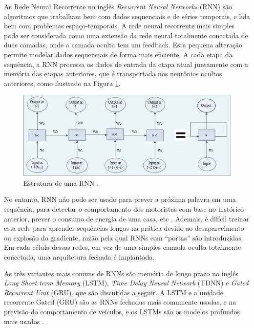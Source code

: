  \label{rnn}

As Rede Neural Recorrente no inglês \textit{Recurrent Neural Networks} (RNN) são algoritmos que trabalham bem com dados sequenciais e de séries temporais, e lida bem com problemas espaço-temporais. A rede neural recorrente mais simples pode ser considerada como uma extensão da rede neural totalmente conectada de duas camadas, onde a camada oculta tem um feedback. Esta pequena alteração permite modelar dados sequenciais de forma mais eficiente. A cada etapa da sequência, a RNN processa os dados de entrada da etapa atual juntamente com a memória das etapas anteriores, que é transportada nos neurônios ocultos anteriores, como ilustrado na Figura \ref{RNN}.

\begin{figure}[H]
\centering
\includegraphics[width=\textwidth]{Figures/RNN.png}
\caption{Estrutura de uma RNN \cite{software-cnn}.}
\label{RNN}
\end{figure}

No entanto, RNN não pode ser usado para prever a próxima palavra em uma sequência, para detectar o comportamento dos motoristas com base no histórico anterior, prever o consumo de energia de uma casa, etc \cite{software-cnn}. Ademais, é difícil treinar essa rede para aprender sequências longas na prática devido ao desaparecimento ou explosão do gradiente, razão pela qual RNNs com “portas” são introduzidas. Em cada célula dessas redes, em vez de uma simples camada oculta totalmente conectada, uma arquitetura fechada é implantada. 

As três variantes mais comuns de RNNs são memória de longo prazo no inglês \textit{Long Short term Memory} (LSTM), \textit{Time Delay Neural Network} (TDNN) e \textit{Gated Recurrent Unit} (GRU), que são discutidas a seguir.
A LSTM e a unidade recorrente Gated (GRU) são as RNNs fechadas mais comumente usadas, e na previsão do comportamento de veículos, e os LSTMs são os modelos profundos mais usados \cite{software-review}.



